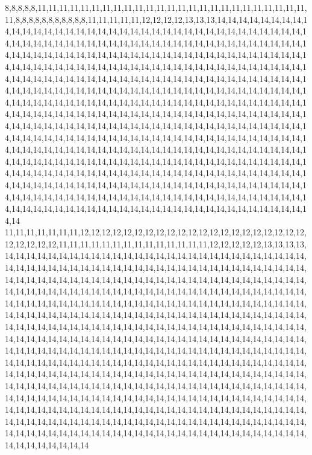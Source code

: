8,8,8,8,8,11,11,11,11,11,11,11,11,11,11,11,11,11,11,11,11,11,11,11,11,11,11,11,11,11,11,8,8,8,8,8,8,8,8,8,8,8,11,11,11,11,11,12,12,12,12,13,13,13,14,14,14,14,14,14,14,14,14,14,14,14,14,14,14,14,14,14,14,14,14,14,14,14,14,14,14,14,14,14,14,14,14,14,14,14,14,14,14,14,14,14,14,14,14,14,14,14,14,14,14,14,14,14,14,14,14,14,14,14,14,14,14,14,14,14,14,14,14,14,14,14,14,14,14,14,14,14,14,14,14,14,14,14,14,14,14,14,14,14,14,14,14,14,14,14,14,14,14,14,14,14,14,14,14,14,14,14,14,14,14,14,14,14,14,14,14,14,14,14,14,14,14,14,14,14,14,14,14,14,14,14,14,14,14,14,14,14,14,14,14,14,14,14,14,14,14,14,14,14,14,14,14,14,14,14,14,14,14,14,14,14,14,14,14,14,14,14,14,14,14,14,14,14,14,14,14,14,14,14,14,14,14,14,14,14,14,14,14,14,14,14,14,14,14,14,14,14,14,14,14,14,14,14,14,14,14,14,14,14,14,14,14,14,14,14,14,14,14,14,14,14,14,14,14,14,14,14,14,14,14,14,14,14,14,14,14,14,14,14,14,14,14,14,14,14,14,14,14,14,14,14,14,14,14,14,14,14,14,14,14,14,14,14,14,14,14,14,14,14,14,14,14,14,14,14,14,14,14,14,14,14,14,14,14,14,14,14,14,14,14,14,14,14,14,14,14,14,14,14,14,14,14,14,14,14,14,14,14,14,14,14,14,14,14,14,14,14,14,14,14,14,14,14,14,14,14,14,14,14,14,14,14,14,14,14,14,14,14,14,14,14,14,14,14,14,14,14,14,14,14,14,14,14,14,14,14,14,14,14,14,14,14,14,14,14,14,14,14,14,14,14,14,14,14,14,14,14,14,14,14,14,14,14,14,14,14,14,14,14,14,14,14,14,14,14,14,14,14,14,14,14,14,14,14,14,14,14,14,14,14,14,14,14,14,14,14,14,14,14,14,14,14,14,14,14,14,14,14,14,14,14,14,14,14,14,14,14,14,14,14,14,14,14,14,14,14,14,14,14,14,14,14,14,14,14,14,14
11,11,11,11,11,11,11,12,12,12,12,12,12,12,12,12,12,12,12,12,12,12,12,12,12,12,12,12,12,12,12,12,12,11,11,11,11,11,11,11,11,11,11,11,11,11,11,12,12,12,12,12,13,13,13,13,14,14,14,14,14,14,14,14,14,14,14,14,14,14,14,14,14,14,14,14,14,14,14,14,14,14,14,14,14,14,14,14,14,14,14,14,14,14,14,14,14,14,14,14,14,14,14,14,14,14,14,14,14,14,14,14,14,14,14,14,14,14,14,14,14,14,14,14,14,14,14,14,14,14,14,14,14,14,14,14,14,14,14,14,14,14,14,14,14,14,14,14,14,14,14,14,14,14,14,14,14,14,14,14,14,14,14,14,14,14,14,14,14,14,14,14,14,14,14,14,14,14,14,14,14,14,14,14,14,14,14,14,14,14,14,14,14,14,14,14,14,14,14,14,14,14,14,14,14,14,14,14,14,14,14,14,14,14,14,14,14,14,14,14,14,14,14,14,14,14,14,14,14,14,14,14,14,14,14,14,14,14,14,14,14,14,14,14,14,14,14,14,14,14,14,14,14,14,14,14,14,14,14,14,14,14,14,14,14,14,14,14,14,14,14,14,14,14,14,14,14,14,14,14,14,14,14,14,14,14,14,14,14,14,14,14,14,14,14,14,14,14,14,14,14,14,14,14,14,14,14,14,14,14,14,14,14,14,14,14,14,14,14,14,14,14,14,14,14,14,14,14,14,14,14,14,14,14,14,14,14,14,14,14,14,14,14,14,14,14,14,14,14,14,14,14,14,14,14,14,14,14,14,14,14,14,14,14,14,14,14,14,14,14,14,14,14,14,14,14,14,14,14,14,14,14,14,14,14,14,14,14,14,14,14,14,14,14,14,14,14,14,14,14,14,14,14,14,14,14,14,14,14,14,14,14,14,14,14,14,14,14,14,14,14,14,14,14,14,14,14,14,14,14,14,14,14,14,14,14,14,14,14,14,14,14,14,14,14,14,14,14,14,14,14,14,14,14,14,14,14,14,14,14,14,14,14,14,14,14,14,14,14,14,14,14,14,14,14,14,14,14,14,14,14,14,14,14,14,14,14,14,14,14,14,14,14,14,14,14,14,14,14,14,14,14,14,14,14,14,14,14,14,14,14,14
